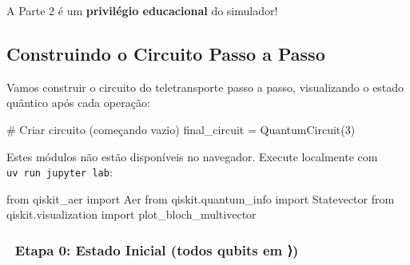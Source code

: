 \documentclass[
  brazilian,
]{report}
\newenvironment{Shaded}{\begin{snugshade}}{\end{snugshade}}
\newcommand{\ImportTok}[1]{\textcolor[rgb]{0.00,0.46,0.62}{#1}}
\newcommand{\NormalTok}[1]{\textcolor[rgb]{0.00,0.23,0.31}{#1}}
\begin{document}
A Parte 2 é um \textbf{privilégio educacional} do simulador! 🎯

\subsection{Construindo o Circuito Passo a
Passo}\label{construindo-o-circuito-passo-a-passo}

Vamos construir o circuito do teletransporte passo a passo, visualizando
o estado quântico após cada operação:

\begin{Shaded}
\begin{Highlighting}[]
\NormalTok{\# Criar circuito (começando vazio)}
\NormalTok{final\_circuit = QuantumCircuit(3)}
\end{Highlighting}
\end{Shaded}

\begin{tcolorbox}[enhanced jigsaw, arc=.35mm, bottomrule=.15mm, bottomtitle=1mm, breakable, colback=white, colbacktitle=quarto-callout-note-color!10!white, colframe=quarto-callout-note-color-frame, coltitle=black, left=2mm, leftrule=.75mm, opacityback=0, opacitybacktitle=0.6, rightrule=.15mm, title=\textcolor{quarto-callout-note-color}{\faInfo}\hspace{0.5em}{🔒 Imports do Qiskit (requerem execução local)}, titlerule=0mm, toprule=.15mm, toptitle=1mm]

Estes módulos não estão disponíveis no navegador. Execute localmente com
\texttt{uv\ run\ jupyter\ lab}:

\begin{Shaded}
\begin{Highlighting}[]
\ImportTok{from}\NormalTok{ qiskit\_aer }\ImportTok{import}\NormalTok{ Aer}
\ImportTok{from}\NormalTok{ qiskit.quantum\_info }\ImportTok{import}\NormalTok{ Statevector}
\ImportTok{from}\NormalTok{ qiskit.visualization }\ImportTok{import}\NormalTok{ plot\_bloch\_multivector}
\end{Highlighting}
\end{Shaded}

\end{tcolorbox}

\subsubsection{🔹 Etapa 0: Estado Inicial (todos qubits em
⟩)}\label{etapa-0-estado-inicial-todos-qubits-em-0}
\end{document}
